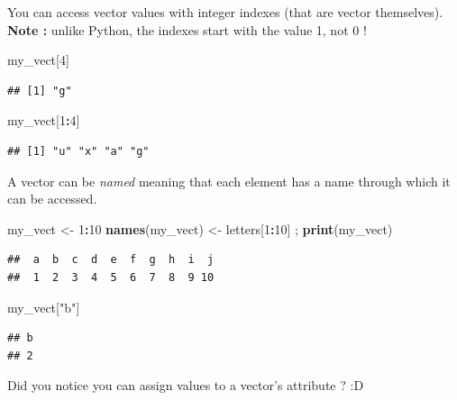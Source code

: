 \documentclass[
]{book}
\newenvironment{Shaded}{\begin{snugshade}}{\end{snugshade}}
\newcommand{\DecValTok}[1]{\textcolor[rgb]{0.00,0.00,0.81}{#1}}
\newcommand{\KeywordTok}[1]{\textcolor[rgb]{0.13,0.29,0.53}{\textbf{#1}}}
\newcommand{\NormalTok}[1]{#1}
\newcommand{\OperatorTok}[1]{\textcolor[rgb]{0.81,0.36,0.00}{\textbf{#1}}}
\newcommand{\StringTok}[1]{\textcolor[rgb]{0.31,0.60,0.02}{#1}}
\begin{document}
You can access vector values with integer indexes (that are vector themselves). \textbf{Note :} unlike Python, the indexes start with the value 1, not 0 !

\begin{Shaded}
\begin{Highlighting}[]
\NormalTok{my_vect[}\DecValTok{4}\NormalTok{]}
\end{Highlighting}
\end{Shaded}

\begin{verbatim}
## [1] "g"
\end{verbatim}

\begin{Shaded}
\begin{Highlighting}[]
\NormalTok{my_vect[}\DecValTok{1}\OperatorTok{:}\DecValTok{4}\NormalTok{]}
\end{Highlighting}
\end{Shaded}

\begin{verbatim}
## [1] "u" "x" "a" "g"
\end{verbatim}

A vector can be \emph{named} meaning that each element has a name through which it can be accessed.

\begin{Shaded}
\begin{Highlighting}[]
\NormalTok{my_vect <-}\StringTok{ }\DecValTok{1}\OperatorTok{:}\DecValTok{10}
\KeywordTok{names}\NormalTok{(my_vect) <-}\StringTok{ }\NormalTok{letters[}\DecValTok{1}\OperatorTok{:}\DecValTok{10}\NormalTok{] ; }\KeywordTok{print}\NormalTok{(my_vect)}
\end{Highlighting}
\end{Shaded}

\begin{verbatim}
##  a  b  c  d  e  f  g  h  i  j 
##  1  2  3  4  5  6  7  8  9 10
\end{verbatim}

\begin{Shaded}
\begin{Highlighting}[]
\NormalTok{my_vect[}\StringTok{"b"}\NormalTok{]}
\end{Highlighting}
\end{Shaded}

\begin{verbatim}
## b 
## 2
\end{verbatim}

Did you notice you can assign values to a vector's attribute ? :D
\end{document}
